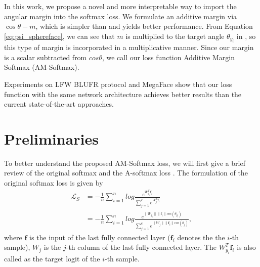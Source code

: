\documentclass[10pt,twocolumn,letterpaper]{article}
\begin{document}
In this work, we propose a novel and more interpretable way to import the angular margin into the softmax loss. We formulate an additive margin via $\cos\theta - m$, which is simpler than \cite{liu2017sphereface} and yields better performance. From Equation \eqref{eq:psi_sphereface}, we can see that $m$ is multiplied to the target angle $\theta_{y_i}$ in \cite{liu2017sphereface}, so this type of margin is incorporated in a multiplicative manner. Since our margin is a scalar subtracted from $cos\theta$, we call our loss function Additive Margin Softmax (AM-Softmax).

Experiments on LFW BLUFR protocol \cite{liao2014benchmark} and MegaFace \cite{kemelmacher2016megaface} show that our loss function with the same network architecture achieves better results than the current state-of-the-art approaches.

\section{Preliminaries}
\label{sec:preliminaries}
To better understand the proposed AM-Softmax loss, we will first give a brief review of the original softmax and the A-softmax loss \cite{liu2017sphereface}. The formulation of the original softmax loss is given by
\begin{equation}
\begin{aligned}
\mathcal{L}_S & = -\frac{1}{n}\sum_{i=1}^n{log\frac{e^{W_{y_i}^T \bm{f}_i}}{\sum_{j=1}^{c}{e^{W_j^T \bm{f}_i}}}}\\
& = -\frac{1}{n}\sum_{i=1}^n{log\frac{e^{\|W_{y_i}\| \|\bm{f}_i\|cos(\theta _{y_i})}}{\sum_{j=1}^{c}{e^{\|W_j\| \|\bm{f}_i\| cos(\theta_{j})}}}},
\label{eq:softmax}
\end{aligned}
\end{equation}
where $\bm{f}$ is the input of the last fully connected layer ($\bm{f}_i$ denotes the the $i$-th sample), $W_j$ is the $j$-th column of the last fully connected layer. The $W_{y_i}^T \bm{f}_i$ is also called as the target logit \cite{pereyra2017regularizing} of the $i$-th sample.
\end{document}
